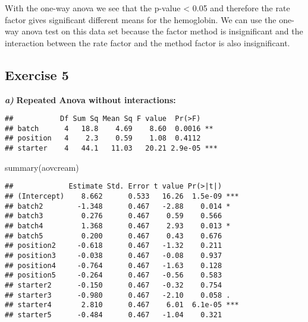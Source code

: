 \documentclass[
]{article}
\newenvironment{Shaded}{\begin{snugshade}}{\end{snugshade}}
\newcommand{\AttributeTok}[1]{\textcolor[rgb]{0.77,0.63,0.00}{#1}}
\newcommand{\FunctionTok}[1]{\textcolor[rgb]{0.00,0.00,0.00}{#1}}
\newcommand{\NormalTok}[1]{#1}
\newcommand{\OtherTok}[1]{\textcolor[rgb]{0.56,0.35,0.01}{#1}}
\newcommand{\SpecialCharTok}[1]{\textcolor[rgb]{0.00,0.00,0.00}{#1}}
\begin{document}
With the one-way anova we see that the p-value \textless{} 0.05 and
therefore the rate factor gives significant different means for the
hemoglobin. We can use the one-way anova test on this data set because
the factor method is insignificant and the interaction between the rate
factor and the method factor is also insignificant.

\hypertarget{exercise-5}{%
\subsection{Exercise 5}\label{exercise-5}}

\textbf{\emph{a)}} \textbf{Repeated Anova without interactions:}

\begin{Shaded}
\end{Shaded}

\begin{verbatim}
##           Df Sum Sq Mean Sq F value  Pr(>F)    
## batch      4   18.8    4.69    8.60  0.0016 ** 
## position   4    2.3    0.59    1.08  0.4112    
## starter    4   44.1   11.03   20.21 2.9e-05 ***
\end{verbatim}

\begin{Shaded}
\begin{Highlighting}[]
\FunctionTok{summary}\NormalTok{(aovcream)}
\end{Highlighting}
\end{Shaded}

\begin{verbatim}
##             Estimate Std. Error t value Pr(>|t|)    
## (Intercept)    8.662      0.533   16.26  1.5e-09 ***
## batch2        -1.348      0.467   -2.88    0.014 *  
## batch3         0.276      0.467    0.59    0.566    
## batch4         1.368      0.467    2.93    0.013 *  
## batch5         0.200      0.467    0.43    0.676    
## position2     -0.618      0.467   -1.32    0.211    
## position3     -0.038      0.467   -0.08    0.937    
## position4     -0.764      0.467   -1.63    0.128    
## position5     -0.264      0.467   -0.56    0.583    
## starter2      -0.150      0.467   -0.32    0.754    
## starter3      -0.980      0.467   -2.10    0.058 .  
## starter4       2.810      0.467    6.01  6.1e-05 ***
## starter5      -0.484      0.467   -1.04    0.321    
\end{verbatim}
\end{document}
